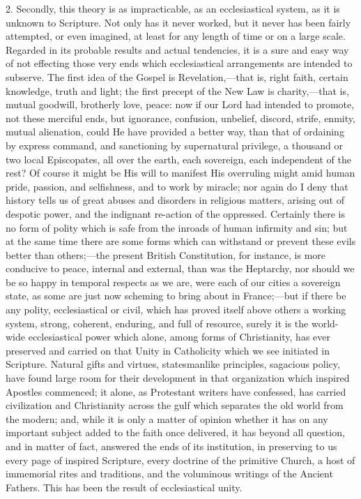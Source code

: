 2. Secondly, this theory is as impracticable, as an ecclesiastical
system, as it is unknown to Scripture. Not only has it never worked,
but it never has been fairly attempted, or even imagined, at least for
any length of time or on a large scale. Regarded in its probable
results and actual tendencies, it is a sure and easy way of not
effecting those very ends which ecclesiastical arrangements are
intended to subserve. The first idea of the Gospel is Revelation,—that
is, right faith, certain knowledge, truth and light; the first precept
of the New Law is charity,—that is, mutual goodwill, brotherly love,
peace: now if our Lord had intended to promote, not these merciful
ends, but ignorance, confusion, unbelief, discord, strife, enmity,
mutual alienation, could He have provided a better way, than that of ordaining by express command, and sanctioning by supernatural
privilege, a thousand or two local Episcopates, all over the earth,
each sovereign, each independent of the rest? Of course it might be
His will to manifest His overruling might amid human pride, passion,
and selfishness, and to work by miracle; nor again do I deny that
history tells us of great abuses and disorders in religious matters,
arising out of despotic power, and the indignant re-action of the
oppressed. Certainly there is no form of polity which is safe from the
inroads of human infirmity and sin; but at the same time there are
some forms which can withstand or prevent these evils better than
others;—the present British Constitution, for instance, is more
conducive to peace, internal and external, than was the Heptarchy, nor
should we be so happy in temporal respects as we are, were each of our
cities a sovereign state, as some are just now scheming to bring about
in France;—but if there be any polity, ecclesiastical or civil,
which has proved itself above others a working system, strong,
coherent, enduring, and full of resource, surely it is the world-wide
ecclesiastical power which alone, among forms of Christianity, has
ever preserved and carried on that Unity in Catholicity which we see
initiated in Scripture. Natural gifts and virtues, statesmanlike
principles, sagacious policy, have found large room for their
development in that organization which inspired Apostles commenced; it
alone, as Protestant writers have confessed, has carried civilization
and Christianity across the gulf which separates the old world from
the modern; and, while it is only a matter of opinion whether it has
on any important subject added to the faith once delivered, it has
beyond all question, and in matter of fact, answered the ends of its
institution, in preserving to us every page of inspired
Scripture, every doctrine of the primitive Church, a host of
immemorial rites and traditions, and the voluminous writings of the
Ancient Fathers. This has been the result of ecclesiastical unity.

